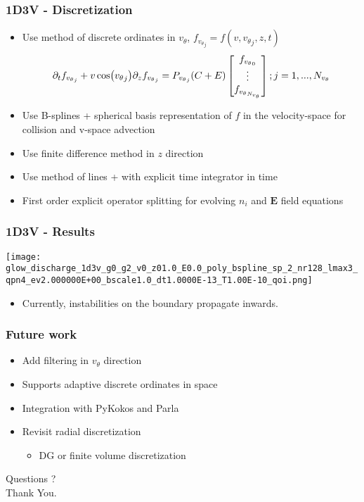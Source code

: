 \documentclass[mathserif, aspectratio=169]{beamer}
\newcommand{\vect}[1]{\boldsymbol{#1}}
\newcommand{\of}[1]{\mleft( #1 \mright)}
\newcommand{\vtheta}{{v_{\theta}}}
\begin{document}
\begin{frame}
	\frametitle{1D3V - Discretization}
	\begin{itemize}
		\item Use method of discrete ordinates in $\vtheta$, $f_{\vtheta_j} = f(v, \vtheta_j, z, t)$
		\begin{align}
			\partial_t f_{\vtheta_j} + v\cos\of{\vtheta_j} \partial_z f_{\vtheta_j} = P_{\vtheta_j} (C + E) \begin{bmatrix}
				f_{\vtheta_0}\\
				\vdots\\
				f_{\vtheta_{N_\vtheta}}\\
			\end{bmatrix} ; j=1,..., N_{\vtheta}
		\end{align}
		\item Use B-splines + spherical basis representation of $f$ in the velocity-space for collision and v-space advection
		\item Use finite difference method in $z$ direction
		\item Use method of lines + with explicit time integrator in time
		\item First order explicit operator splitting for evolving $n_i$ and $\vect{E}$ field equations
	\end{itemize}
\end{frame}

\begin{frame}
	\frametitle{1D3V - Results}
	\begin{center}
		\texttt{[image: glow\_discharge\_1d3v\_g0\_g2\_v0\_z01.0\_E0.0\_poly\_bspline\_sp\_2\_nr128\_lmax3\_qpn4\_ev2.000000E+00\_bscale1.0\_dt1.0000E-13\_T1.00E-10\_qoi.png]}
	\end{center}
	\begin{itemize}
		\item Currently, instabilities on the boundary propagate inwards.
	\end{itemize}
\end{frame}

\begin{frame}
	\frametitle{Future work}
	\begin{itemize}
		\item Add filtering in $\vtheta$ direction
		\item Supports adaptive discrete ordinates in space
		\item Integration with PyKokos and Parla
		\item Revisit radial discretization
		\begin{itemize}
			\item DG or finite volume discretization
		\end{itemize}
	\end{itemize}
\end{frame}

\begin{frame}
	\centering
	\Huge Questions ? \\
	\centering
	\Huge Thank You. 
\end{frame}
\end{document}
